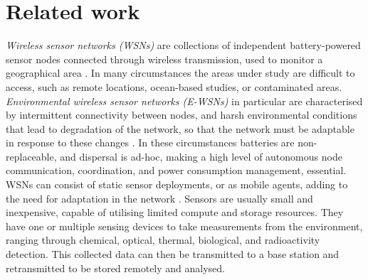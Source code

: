\section{Related work}
\label{section:background}

\textit{Wireless sensor networks (WSNs)} are collections of independent battery-powered sensor nodes connected through wireless transmission, used to monitor a geographical area \citep{Akyildiz,Yick2008a}. In many circumstances the areas under study are difficult to access, such as remote locations, ocean-based studies, or contaminated areas. \textit{Environmental wireless sensor networks (E-WSNs)} in particular are characterised by intermittent connectivity between nodes, and harsh environmental conditions that lead to degradation of the network, so that the network must be adaptable in response to these changes \citep{Oliveira2011}. In these circumstances batteries are non-replaceable, and dispersal is ad-hoc, making a high level of autonomous node communication, coordination, and power consumption management, essential. WSNs can consist of static sensor deployments, or as mobile agents, adding to the need for adaptation in the network \citep{ramasamy2017mobile, 4224091}. Sensors are usually small and inexpensive, capable of utilising limited compute and storage resources. They have one or multiple sensing devices to take measurements from the environment, ranging through chemical, optical, thermal, biological, and radioactivity detection. This collected data can then be transmitted to a base station and retransmitted to be stored remotely and analysed.


